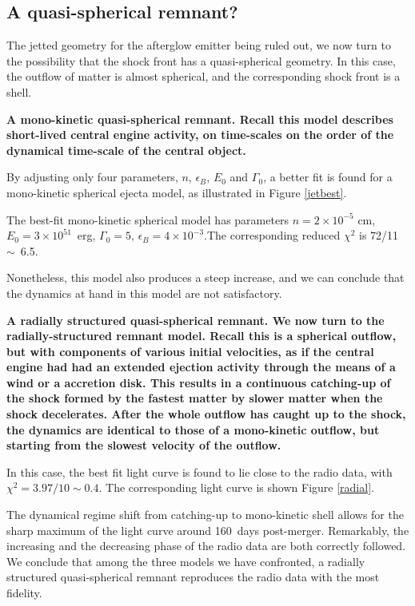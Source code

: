 \subsection{A quasi-spherical remnant?}
\label{QSR}
The jetted geometry for the afterglow emitter being ruled out, we now turn to the possibility that the shock front has a quasi-spherical geometry. In this case, the outflow of matter is almost spherical, and the corresponding shock front is a shell.

\bf{A mono-kinetic quasi-spherical remnant. }Recall this model describes short-lived central engine activity, on time-scales on the order of the dynamical time-scale of the central object.

By adjusting only four parameters, $n$, $\epsilon_B$, $E_0$ and $\Gamma_0$, a better fit is found for a mono-kinetic spherical ejecta model, as illustrated in Figure \ref{jetbest}.

The best-fit mono-kinetic spherical model has parameters $n = 2 \times 10^{-5}$ cm, $E_0 = 3 \times 10^{51}$~erg, $\Gamma_0 = 5$, $\epsilon_B = 4 \times 10^{-3}$.The corresponding reduced $\chi^2$ is 72/11~$\sim$~6.5.

Nonetheless, this model also produces a steep increase, and we can conclude that the dynamics at hand in this model are not satisfactory.

\bf{A radially structured quasi-spherical remnant. }We now turn to the radially-structured remnant model. Recall this is a spherical outflow, but with components of various initial velocities, as if the central engine had had an extended ejection activity through the means of a wind or a accretion disk. This results in a continuous catching-up of the shock formed by the fastest matter by slower matter when the shock decelerates. After the whole outflow has caught up to the shock, the dynamics are identical to those of a mono-kinetic outflow, but starting from the slowest velocity of the outflow.

In this case, the best fit light curve is found to lie close to the radio data, with $\chi^2 = 3.97/10 \sim 0.4$. The corresponding light curve is shown Figure \ref{radial}.


The dynamical regime shift from catching-up to mono-kinetic shell allows for the sharp maximum of the light curve around 160~days post-merger. Remarkably, the increasing and the decreasing phase of the radio data are both correctly followed. We conclude that among the three models we have confronted, a radially structured quasi-spherical remnant reproduces the radio data with the most fidelity.

